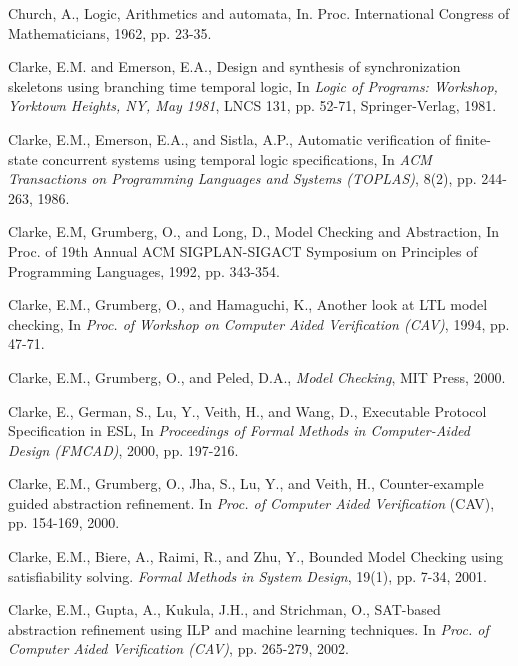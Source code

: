 {\begin{thebibliography}{99}
%
 Church, A., Logic, Arithmetics and automata, 
		In. Proc. International Congress of Mathematicians, 1962, 
		pp. 23-35.

  Clarke, E.M. and Emerson, E.A.,  Design and synthesis of
        synchronization skeletons using branching time temporal logic,
        In {\em Logic of Programs: Workshop, Yorktown Heights, NY, May 1981},
        LNCS 131, pp. 52-71, Springer-Verlag, 1981. 

  Clarke, E.M., Emerson, E.A., and Sistla, A.P., Automatic
        verification of finite-state concurrent systems using temporal logic
        specifications, In {\em ACM Transactions on Programming Languages and 
	Systems (TOPLAS)}, 8(2), pp. 244-263, 1986.

 Clarke, E.M, Grumberg, O., and Long, D., Model Checking 
	and Abstraction, In Proc. of 19th Annual ACM SIGPLAN-SIGACT Symposium 
	on Principles of Programming Languages, 1992, pp. 343-354.

 Clarke, E.M., Grumberg, O., and Hamaguchi, K., Another look
	at LTL model checking, In {\em Proc. of Workshop on Computer Aided
	Verification (CAV)}, 1994, pp. 47-71.

 Clarke, E.M., Grumberg, O., and Peled, D.A.,
        {\em Model Checking}, MIT Press, 2000.

 Clarke, E., German, S., Lu, Y., Veith, H., and Wang, D.,
        Executable Protocol Specification in ESL, 
        In {\em Proceedings of Formal Methods in Computer-Aided Design
        (FMCAD)}, 2000, pp. 197-216.

 Clarke, E.M., Grumberg, O., Jha, S., Lu, Y., and
	Veith, H., Counter-example guided abstraction refinement. In
	{\em Proc. of Computer Aided Verification} (CAV), pp. 154-169, 2000.

 Clarke, E.M., Biere, A., Raimi, R., and Zhu, Y.,
	Bounded Model Checking using satisfiability solving. {\em Formal
	Methods in System Design}, 19(1), pp. 7-34, 2001.

 Clarke, E.M., Gupta, A., Kukula, J.H., and Strichman, O.,
	SAT-based abstraction refinement using ILP and machine learning
	techniques. In {\em Proc. of Computer Aided Verification (CAV)},
	pp. 265-279, 2002.


\end{thebibliography}}
